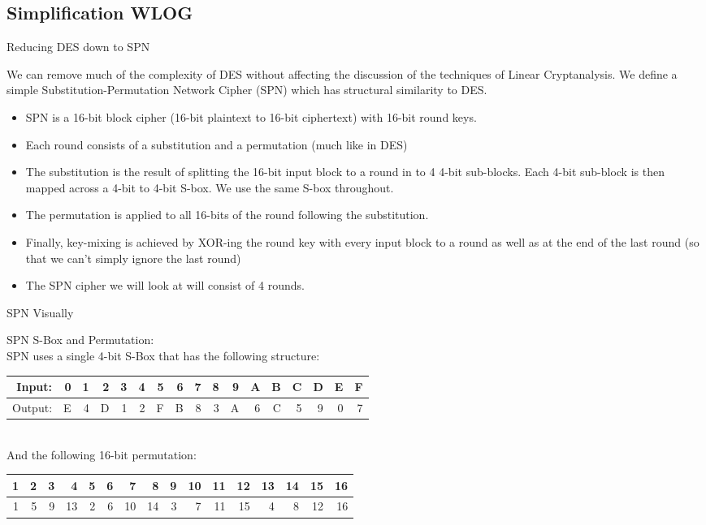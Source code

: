 \documentclass[9pt]{beamer}
\begin{document}
\subsection{Simplification WLOG}
\begin{frame}
Reducing DES down to SPN

We can remove much of the complexity of DES without affecting the discussion of the techniques of Linear Cryptanalysis. We define a simple Substitution-Permutation Network Cipher (SPN) which has structural similarity to DES.

\begin{itemize}
\item SPN is a 16-bit block cipher (16-bit plaintext to 16-bit ciphertext) with 16-bit round keys.
\item Each round consists of a substitution and a permutation (much like in DES)
\item The substitution is the result of splitting the 16-bit input block to a round in to 4 4-bit sub-blocks. Each 4-bit sub-block is then mapped across a 4-bit to 4-bit S-box. We use the same S-box throughout. 
\item The permutation is applied to all 16-bits of the round following the substitution.
\item Finally, key-mixing is achieved by XOR-ing the round key with every input block to a round as well as at the end of the last round (so that we can't simply ignore the last round)
\item The SPN cipher we will look at will consist of 4 rounds.
\end{itemize}


\end{frame}

\begin{frame}
SPN Visually
\end{frame}

\begin{frame}
SPN S-Box and Permutation:\\
\vspace{5mm}
SPN uses a single 4-bit S-Box that has the following structure:
\begin{tabular}{|r|r|r|r|r|r|r|r|r|r|r|r|r|r|r|r|r|}
\hline
Input: & 0 & 1 & 2 & 3 & 4 & 5 & 6 & 7 & 8 & 9 & A & B & C & D & E & F \\
\hline
Output:& E & 4 & D & 1 & 2 & F & B & 8 & 3 & A & 6 & C & 5 & 9 & 0 & 7 \\
\hline
\end{tabular}\\
\vspace{5mm}
And the following 16-bit permutation:
\begin{tabular}{|r|r|r|r|r|r|r|r|r|r|r|r|r|r|r|r|}
\hline
1 & 2 & 3 & 4 & 5 & 6 & 7 & 8 & 9 & 10 & 11 & 12 & 13 & 14 & 15 & 16\\
\hline
1 & 5 & 9 & 13 & 2 & 6 & 10 & 14 & 3 & 7 & 11 & 15 & 4 & 8 & 12 & 16 \\
\hline
\end{tabular}
\vspace{5mm}

\end{frame}
\end{document}
